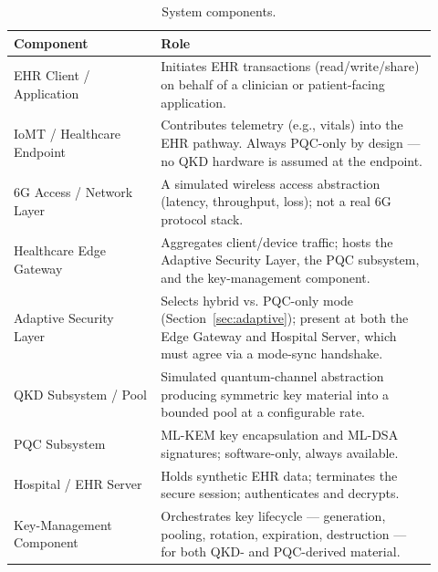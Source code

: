 \documentclass[journal]{IEEEtran}
\begin{document}
\begin{table}[t]
\centering
\caption{System components.}
\label{tab:components}
\small
\begin{tabular}{@{}p{0.32\linewidth}p{0.60\linewidth}@{}}
\toprule
Component & Role \\
\midrule
EHR Client / Application & Initiates EHR transactions (read/write/share) on behalf of a clinician or patient-facing application. \\
IoMT / Healthcare Endpoint & Contributes telemetry (e.g., vitals) into the EHR pathway. Always PQC-only by design --- no QKD hardware is assumed at the endpoint. \\
6G Access / Network Layer & A simulated wireless access abstraction (latency, throughput, loss); not a real 6G protocol stack. \\
Healthcare Edge Gateway & Aggregates client/device traffic; hosts the Adaptive Security Layer, the PQC subsystem, and the key-management component. \\
Adaptive Security Layer & Selects hybrid vs. PQC-only mode (Section~\ref{sec:adaptive}); present at both the Edge Gateway and Hospital Server, which must agree via a mode-sync handshake. \\
QKD Subsystem / Pool & Simulated quantum-channel abstraction producing symmetric key material into a bounded pool at a configurable rate. \\
PQC Subsystem & ML-KEM key encapsulation and ML-DSA signatures; software-only, always available. \\
Hospital / EHR Server & Holds synthetic EHR data; terminates the secure session; authenticates and decrypts. \\
Key-Management Component & Orchestrates key lifecycle --- generation, pooling, rotation, expiration, destruction --- for both QKD- and PQC-derived material. \\
\bottomrule
\end{tabular}
\end{table}
\end{document}
